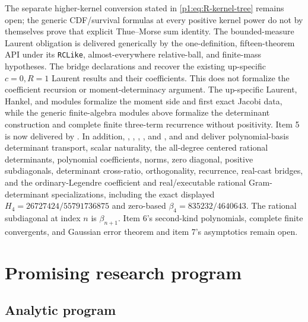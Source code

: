 \documentclass[11pt]{article}
\theoremstyle{definition}
\theoremstyle{remark}
\begin{document}
\begin{problem}
The separate higher-kernel conversion stated in \eqref{p1:eq:R-kernel-tree}
remains open; the generic CDF/survival formulas at every positive kernel power
do not by themselves prove that explicit Thue--Morse sum identity.  The
bounded-measure Laurent obligation is delivered generically by the one-definition,
fifteen-theorem  API under its
\texttt{RCLike}, almost-everywhere relative-ball, and finite-mass hypotheses.
The bridge declarations  and
 recover the existing up-specific
\(c=0,R=1\) Laurent results and their  coefficients.  This does
not formalize the coefficient recursion or moment-determinacy argument.  The
up-specific Laurent, Hankel, and 
modules formalize the moment side and first exact Jacobi data, while the
generic finite-algebra modules above formalize the determinant construction
and complete finite three-term recurrence without positivity.  Item 5 is now
delivered by .  In addition,
,
,
, , and
, and
 and
 deliver polynomial-basis determinant
transport, scalar naturality, the all-degree centered rational determinants,
polynomial coefficients, norms, zero diagonal, positive subdiagonals,
determinant cross-ratio, orthogonality, recurrence, real-cast bridges, and the
ordinary-Legendre coefficient and real/executable rational Gram-determinant
specializations, including the exact displayed
\(H_4=26727424/55791736875\) and zero-based
\(\beta_4=835232/4640643\).  The rational subdiagonal at index \(n\) is
\(\beta_{n+1}\).  Item 6's
second-kind polynomials, complete finite convergents, and Gaussian error
theorem and item 7's asymptotics remain open.
\end{problem}

\section{Promising research program}

\subsection{Analytic program}
\end{document}
